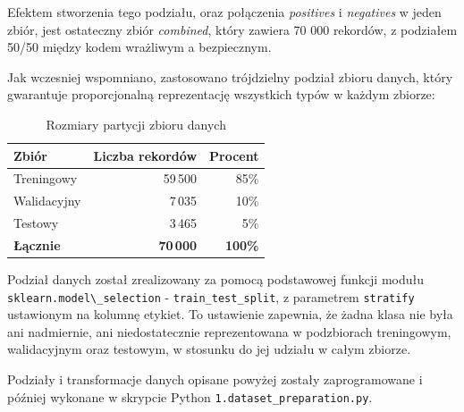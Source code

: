 \documentclass[12pt,a4paper]{article}
\begin{document}
Efektem stworzenia tego podziału, oraz połączenia \emph{positives} i \emph{negatives} w jeden zbiór, jest ostateczny zbiór \emph{combined}, który zawiera 70 000 rekordów, 
z podziałem 50/50 między kodem wrażliwym a bezpiecznym.

Jak wczesniej wspomniano, zastosowano trójdzielny podział zbioru danych, który gwarantuje proporcjonalną reprezentację wszystkich typów w każdym zbiorze:

\begin{table}[H]
    \centering
    \begin{tabular}{lrr}
        \toprule
        \textbf{Zbiór}   & \textbf{Liczba rekordów} & \textbf{Procent} \\
        \midrule
        Treningowy          & 59\,500 & 85\% \\
        Walidacyjny         & 7\,035  & 10\% \\
        Testowy             & 3\,465  & 5\%  \\
        \midrule
        \textbf{Łącznie}    & \textbf{70\,000} & \textbf{100\%} \\
        \bottomrule
    \end{tabular}
    \caption{Rozmiary partycji zbioru danych}
\end{table}
\label{tab:dataset_split}

Podział danych został zrealizowany za pomocą podstawowej funkcji modułu \\ \verb|sklearn.model\_selection| - 
\texttt{train\_test\_split}, z parametrem \texttt{stratify} ustawionym na kolumnę etykiet. To ustawienie zapewnia, że żadna klasa nie była ani nadmiernie, ani
niedostatecznie reprezentowana w podzbiorach treningowym, walidacyjnym oraz testowym, w stosunku do jej udziału w całym zbiorze.

Podziały i transformacje danych opisane powyżej zostały zaprogramowane i później wykonane w skrypcie Python \texttt{1.dataset\_preparation.py}. 



\end{document}
